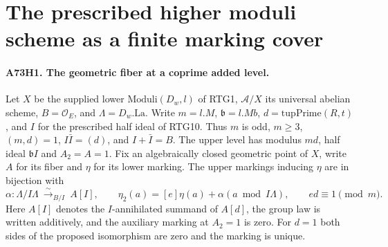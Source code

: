 \section{The prescribed higher moduli scheme as a finite marking cover}
\label{sec:relative-higher-moduli}

\paragraph{A73H1. The geometric fiber at a coprime added level.}
\label{claim:A73H1}
Let $X$ be the supplied lower $\mathrm{Moduli}(D_w,l)$ of RTG1,
$\mathcal A/X$ its universal abelian scheme,
$B=\mathcal O_E$, and $\Lambda=D_w.\mathrm{La}$. Write
$m=l.M$, $\mathfrak b=l.Mb$, $d=\mathrm{tupPrime}(R,t)$, and
$I$ for the prescribed half ideal of RTG10. Thus $m$ is odd,
$m\ge 3$, $(m,d)=1$, $I\bar I=(d)$, and $I+\bar I=B$.
The upper level has modulus $md$, half ideal $\mathfrak b I$
and $A_2=A=1$. Fix an algebraically closed geometric point of $X$,
write $A$ for its fiber and $\eta$ for its lower marking.
The upper markings inducing $\eta$ are in bijection with
\[
 \alpha:\Lambda/I\Lambda\ \xrightarrow{\ \sim\ }_{B/I}\ A[I],
 \qquad
 \eta_2(a)=[e]\eta(a)+\alpha(a\bmod I\Lambda),
 \qquad ed\equiv1\pmod m .
 \tag{A73.1}
\]
Here $A[I]$ denotes the $I$-annihilated summand of $A[d]$,
the group law is written additively, and the auxiliary marking at
$A_2=1$ is zero. For $d=1$ both sides of the proposed isomorphism
are zero and the marking is unique.

